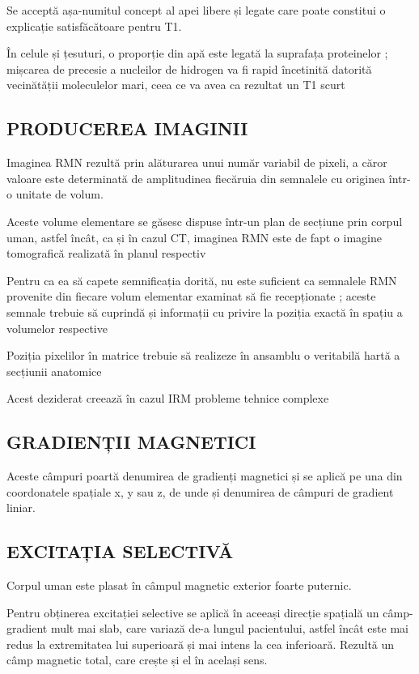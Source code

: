 \documentclass{article}
\begin{document}
Se acceptă așa-numitul concept al apei libere și legate care poate constitui o explicație satisfăcătoare pentru T1.

În celule și țesuturi, o proporție din apă este legată la suprafața proteinelor ; mișcarea de precesie a nucleilor de hidrogen va fi rapid încetinită datorită vecinătății moleculelor mari, ceea ce va avea ca rezultat un T1 scurt



\subsection{PRODUCEREA IMAGINII }



Imaginea RMN rezultă prin alăturarea unui număr variabil de pixeli, a căror valoare este determinată de amplitudinea fiecăruia din semnalele cu originea într-o unitate de volum.

Aceste volume elementare se găsesc dispuse într-un plan de secțiune prin corpul uman, astfel încât, ca și în cazul CT, imaginea RMN este de fapt o imagine tomografică realizată în planul respectiv

Pentru ca ea să capete semnificația dorită, nu este suficient ca semnalele RMN provenite din fiecare volum elementar examinat să fie recepționate ; aceste semnale trebuie să cuprindă și informații cu privire la poziția exactă în spațiu a volumelor respective

Poziția pixelilor în matrice trebuie să realizeze în ansamblu o veritabilă hartă a secțiunii anatomice

Acest deziderat creează în cazul IRM probleme tehnice complexe



\subsection{GRADIENȚII MAGNETICI}

Aceste câmpuri poartă denumirea de gradienți magnetici și se aplică pe una din coordonatele spațiale x, y sau z, de unde și denumirea de câmpuri de gradient liniar.

\subsection{EXCITAȚIA SELECTIVĂ }


Corpul uman este plasat în câmpul magnetic exterior foarte puternic.

Pentru obținerea excitației selective se aplică în aceeași direcție spațială un câmp-gradient mult mai slab, care variază de-a lungul pacientului, astfel încât este mai redus la extremitatea lui superioară și mai intens la cea inferioară. Rezultă un câmp magnetic total, care crește și el în același sens.
\end{document}
